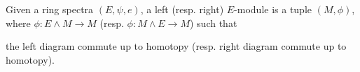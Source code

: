 \begin{definition}
    Given a ring spectra $(E,\psi, e)$, a left (resp. right) $E$-module is a tuple $(M, \phi)$, where $\phi: E\wedge M\to M$ (resp. $\phi: M\wedge E\to M$) such that
    \begin{center}
    \end{center} the left diagram commute up to homotopy (resp. right diagram commute up to homotopy).
\end{definition}
